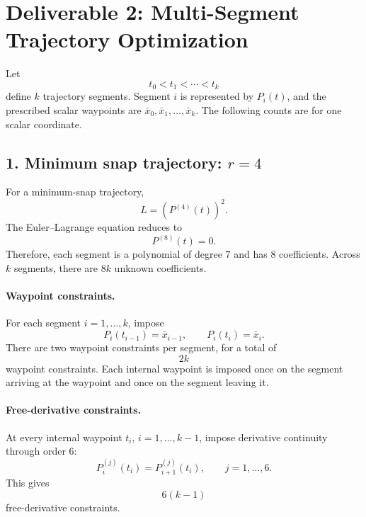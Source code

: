 \documentclass[11pt]{article}
\begin{document}
\section*{Deliverable 2: Multi-Segment Trajectory Optimization}

Let
\begin{equation}
    t_0<t_1<\cdots<t_k
\end{equation}
define $k$ trajectory segments. Segment $i$ is represented by
$P_i(t)$, and the prescribed scalar waypoints are
$\bar{x}_0,\bar{x}_1,\ldots,\bar{x}_k$. The following counts are for
one scalar coordinate.

\subsection*{1. Minimum snap trajectory: $r=4$}

For a minimum-snap trajectory,
\begin{equation}
    L=\left(P^{(4)}(t)\right)^2.
\end{equation}
The Euler--Lagrange equation reduces to
\begin{equation}
    P^{(8)}(t)=0.
\end{equation}
Therefore, each segment is a polynomial of degree $7$ and has $8$
coefficients. Across $k$ segments, there are $8k$ unknown coefficients.

\paragraph{Waypoint constraints.}
For each segment $i=1,\ldots,k$, impose
\begin{equation}
    P_i(t_{i-1})=\bar{x}_{i-1},
    \qquad
    P_i(t_i)=\bar{x}_i.
\end{equation}
There are two waypoint constraints per segment, for a total of
\begin{equation}
    2k
\end{equation}
waypoint constraints. Each internal waypoint is imposed once on the
segment arriving at the waypoint and once on the segment leaving it.

\paragraph{Free-derivative constraints.}
At every internal waypoint $t_i$, $i=1,\ldots,k-1$, impose derivative
continuity through order $6$:
\begin{equation}
    P_i^{(j)}(t_i)=P_{i+1}^{(j)}(t_i),
    \qquad
    j=1,\ldots,6.
\end{equation}
This gives
\begin{equation}
    6(k-1)
\end{equation}
free-derivative constraints.
\end{document}
